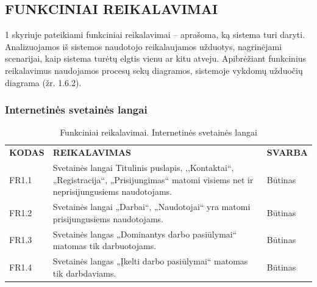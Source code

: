 \documentclass{VUMIFPSkursinis}
\begin{document}
\subsection{FUNKCINIAI REIKALAVIMAI}
1 skyriuje pateikiami funkciniai reikalavimai – aprašoma, ką sistema turi daryti. Analizuojamos iš sistemos naudotojo reikalaujamos užduotys, nagrinėjami scenarijai, kaip sistema turėtų elgtis vienu ar kitu atveju. Apibrėžiant funkcinius reikalavimus naudojamos procesų sekų diagramos, sistemoje vykdomų užduočių diagrama (žr. 1.6.2).

\subsubsection{Internetinės svetainės langai}
\begin{table}[H]
\caption{Funkciniai reikalavimai. Internetinės svetainės langai}
\centering
\normalsize
\begin{tabular}{|p{2cm}|p{10cm}|p{3cm}|}
\hline
\rowcolor{gray!30}
\multicolumn{3}{|l|}{\textbf{1. Internetinės svetainės langai}} \\ \hline
\textbf{KODAS}& \multicolumn{1}{m{10cm}|}{\textbf{REIKALAVIMAS}} & \textbf{SVARBA} \\ \hline
FR1.1 & \multicolumn{1}{m{10cm}|}{Svetainės langai Titulinis puslapis,  ,,Kontaktai“, „Registracija“, „Prisijungimas“ matomi visiems net ir neprisijungusiems naudotojams.} & Būtinas \\ \hline
FR1.2 & \multicolumn{1}{m{10cm}|}{Svetainės langai „Darbai“, „Naudotojai“ yra matomi prisijungusiems naudotojams.} & Būtinas \\ \hline
FR1.3 & \multicolumn{1}{m{10cm}|}{Svetainės langas „Dominantys darbo pasiūlymai“ matomas tik darbuotojams.} & Būtinas \\ \hline
FR1.4 & \multicolumn{1}{m{10cm}|}{Svetainės langas „Įkelti darbo pasiūlymai“ matomas tik darbdaviams.} & Būtinas \\ \hline
\end{tabular}
\end{table}

\end{document}

